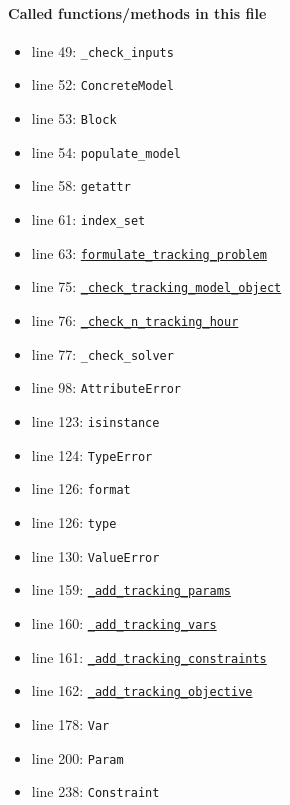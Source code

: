 \documentclass[11pt]{report}
\begin{document}
\paragraph{Called functions/methods in this file}
\begin{itemize}[leftmargin=*]
  \item line 49: \texttt{\_check\_inputs}
  \item line 52: \texttt{ConcreteModel}
  \item line 53: \texttt{Block}
  \item line 54: \texttt{populate\_model}
  \item line 58: \texttt{getattr}
  \item line 61: \texttt{index\_set}
  \item line 63: \hyperref[def:tracker.py:Tracker.formulate_tracking_problem:L147]{\texttt{formulate\_tracking\_problem}}
  \item line 75: \hyperref[def:tracker.py:Tracker._check_tracking_model_object:L79]{\texttt{\_check\_tracking\_model\_object}}
  \item line 76: \hyperref[def:tracker.py:Tracker._check_n_tracking_hour:L117]{\texttt{\_check\_n\_tracking\_hour}}
  \item line 77: \texttt{\_check\_solver}
  \item line 98: \texttt{AttributeError}
  \item line 123: \texttt{isinstance}
  \item line 124: \texttt{TypeError}
  \item line 126: \texttt{format}
  \item line 126: \texttt{type}
  \item line 130: \texttt{ValueError}
  \item line 159: \hyperref[def:tracker.py:Tracker._add_tracking_params:L187]{\texttt{\_add\_tracking\_params}}
  \item line 160: \hyperref[def:tracker.py:Tracker._add_tracking_vars:L166]{\texttt{\_add\_tracking\_vars}}
  \item line 161: \hyperref[def:tracker.py:Tracker._add_tracking_constraints:L219]{\texttt{\_add\_tracking\_constraints}}
  \item line 162: \hyperref[def:tracker.py:Tracker._add_tracking_objective:L244]{\texttt{\_add\_tracking\_objective}}
  \item line 178: \texttt{Var}
  \item line 200: \texttt{Param}
  \item line 238: \texttt{Constraint}

\end{itemize}
\end{document}
